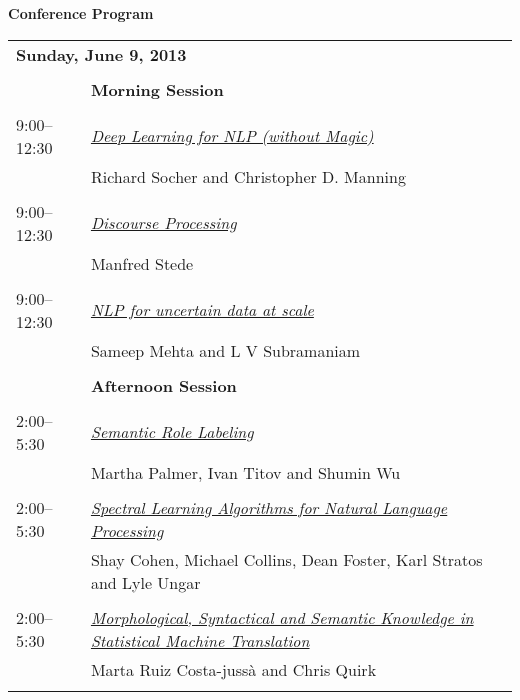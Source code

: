 \setlength{\parindent}{0in}
\setlength{\parskip}{2ex}
\renewcommand{\baselinestretch}{0.87}

\begin{center}
{\Large \bf
  Conference Program
}
\end{center}
\vspace{3mm}
\begin{tabular}{p{20mm}p{128mm}}
\multicolumn{2}{l}{\bf Sunday, June 9, 2013} \\
\\
 & {\bf Morning Session} \\
\\
9:00--12:30 & \hyperlink{page.1}{\em Deep Learning for NLP (without Magic)}\\
         & Richard Socher and Christopher D. Manning \\
\\

9:00--12:30 & \hyperlink{page.4}{\em Discourse Processing}\\
         & Manfred Stede \\
\\

9:00--12:30 & \hyperlink{page.7}{\em NLP for uncertain data at scale}\\
         & Sameep Mehta and L V Subramaniam \\
\\

 & {\bf Afternoon Session} \\
\\
2:00--5:30 & \hyperlink{page.10}{\em Semantic Role Labeling}\\
         & Martha Palmer, Ivan Titov and Shumin Wu \\
\\

2:00--5:30 & \hyperlink{page.13}{\em Spectral Learning Algorithms for Natural Language Processing}\\
         & Shay Cohen, Michael Collins, Dean Foster, Karl Stratos and Lyle Ungar \\
\\

2:00--5:30 & \hyperlink{page.16}{\em Morphological, Syntactical and Semantic Knowledge in Statistical Machine Translation}\\
         & Marta Ruiz Costa-juss\`{a} and Chris Quirk \\
\\



\end{tabular}
